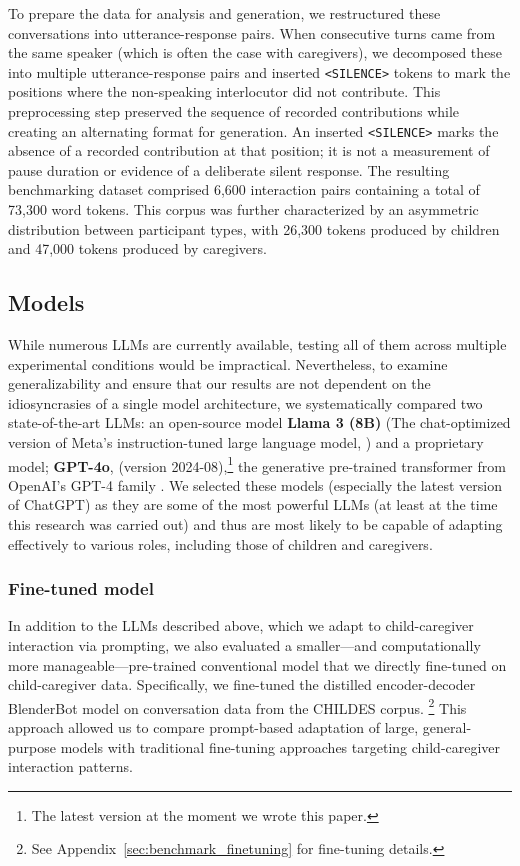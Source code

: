 To prepare the data for analysis and generation, we restructured these conversations into utterance-response pairs.  When consecutive turns came from the same speaker (which is often the case with caregivers), we decomposed these into multiple utterance-response pairs and inserted \texttt{<SILENCE>} tokens to mark the positions where the non-speaking interlocutor did not contribute. This preprocessing step preserved the sequence of recorded contributions while creating an alternating format for generation. An inserted \texttt{<SILENCE>} marks the absence of a recorded contribution at that position; it is not a measurement of pause duration or evidence of a deliberate silent response. The resulting benchmarking dataset comprised 6,600 interaction pairs containing a total of 73,300 word tokens. This corpus was further characterized by an asymmetric distribution between participant types, with 26,300 tokens produced by children and 47,000 tokens produced by caregivers.



\subsection{Models}  

While numerous LLMs are currently available, testing all of them across multiple experimental conditions would be impractical. Nevertheless, to examine generalizability and ensure that our results are not dependent on the idiosyncrasies of a single model architecture, we systematically compared two state-of-the-art LLMs: an open-source model \textbf{Llama 3 (8B)} (The chat-optimized version of Meta's instruction-tuned large language model, \citep{touvron2023llama}) and a proprietary model; \textbf{GPT-4o}, (version 2024-08),\footnote{The latest version at the moment we wrote this paper.} the generative pre-trained transformer from OpenAI's GPT-4 family \citep{achiam2023gpt}. We selected these models (especially the latest version of ChatGPT) as they are some of the most powerful LLMs (at least at the time this research was carried out) and thus are most likely to be capable of adapting effectively to various roles, including those of children and caregivers.

\subsubsection{Fine-tuned model}  

In addition to the LLMs described above, which we adapt to child-caregiver interaction via prompting, we also evaluated a smaller---and computationally more manageable—pre-trained conventional model that we directly fine-tuned on child-caregiver data. Specifically, we fine-tuned the distilled encoder-decoder BlenderBot model \citep{roller2020recipes} on conversation data from the CHILDES corpus. \footnote{See Appendix~\ref{sec:benchmark_finetuning} for fine-tuning details.} This approach allowed us to compare prompt-based adaptation of large, general-purpose models with traditional fine-tuning approaches targeting child-caregiver interaction patterns.



